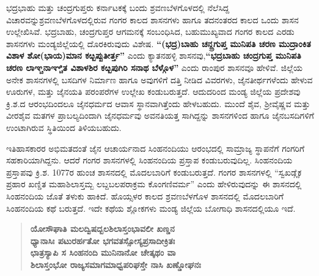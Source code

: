ಭದ್ರಭಾಹು ಮತ್ತು ಚಂದ್ರಗುಪ್ತರು ಕರ್ನಾಟಕಕ್ಕೆ ಬಂದು ಶ್ರವಣಬೆಳಗೊಳದಲ್ಲಿ ನೆಲೆಸಿದ್ದ ವಿಚಾರವನ್ನು\break ಶ್ರವಣಬೆಳಗೊಳದಲ್ಲಿರುವ ಗಂಗರ ಕಾಲದ ಶಾಸನಗಳು ಹಾಗೂ ತದನಂತರದ ಕಾಲದ ಒಂದು ಶಾಸನ ಉಲ್ಲೇಖಿಸಿವೆ. ಭದ್ರಬಾಹು, ಚಂದ್ರಗುಪ್ತರ ಆಗಮನಕ್ಕೆ ಸಂಬಂಧಿಸಿದ, ಬಹುಮುಖ್ಯವಾದ ಗಂಗರ ಕಾಲದ ಎರಡು ಶಾಸನಗಳು ಮಂಡ್ಯಜಿಲ್ಲೆ\-ಯಲ್ಲಿ ದೊರಕಿರುವುದು ವಿಶೇಷ. \textbf{“(ಭದ್ರ)ಬಾಹು ಚನ್ದ್ರಗುಪ್ತ ಮುನಿಪತಿ ಚರಣ ಮುದ್ರಾಂಕಿತ ವಿಶಾಳ ಶೋ(ಭಾಯ)ಮಾನ ಕೞ್ಬಪ್ಪುತೀರ್ತ್ತ”} ಎಂದು ಕ್ಯಾತನಹಳ್ಳಿ ಶಾಸನವು,\textbf{“ಭದ್ರಬಾಹು ಚಂದ್ರಗುಪ್ತ ಮುನಿಪತಿ ಚರಣ ಲಾಞ್ಚನಾಞ್ಚಿತ ವಿಶಾಳಶಿರ ಕೞ್ಬಪುಗಿರಿ ಸನಾಥ ಬೆಳ್ಗೊಳ”} ಎಂದು ರಾಂಪುರ ಶಾಸನವೂ ಹೇಳಿವೆ. ಜಿಲ್ಲೆಯ ಅನೇಕ ಶಾಸನಗಳಲ್ಲಿ ಬಸದಿಗಳ ನಿರ್ಮಾಣ ಹಾಗೂ ಅವುಗಳಿಗೆ ದತ್ತಿ ನೀಡಿದ ವಿವರಗಳು, ಜೈನತೀರ್ಥಗಳೆಂದು ಹೇಳುವ ಊರುಗಳ, ಮತ್ತು ಜೈನಯತಿ ಪರಂಪರೆಗಳ ಉಲ್ಲೇಖ ಕಂಡುಬರುತ್ತದೆ. ಆದುದರಿಂದ ಮಂಡ್ಯ ಜಿಲ್ಲೆಯ ಪ್ರದೇಶವು ಕ್ರಿ.ಶ.ದ ಆರಂಭದಿಂದಲೂ ಜೈನಧರ್ಮದ ಆವಾಸ ಸ್ಥಾನವಾಗಿತ್ತೆಂದು ಹೇಳಬಹುದು. ಮುಂದೆ ಶೈವ, ಶ‍್ರೀವೈಷ್ಣವ ಮತ್ತು ವೀರಶೈವ ಮತಗಳ ಪ್ರಾಬಲ್ಯದಿಂದಾಗಿ ಜೈನಧರ್ಮವು ಅವನತಿಯತ್ತ ಸಾಗಿದ್ದನ್ನು ಶಾಸನಗಳಿಂದ ಹಾಗೂ ಜೈನಬಸದಿಗಳಿಗೆ ಉಂಟಾಗಿರುವ ಸ್ಥಿತಿಯಿಂದ ತಿಳಿಯಬಹುದು.

ಇತಿಹಾಸಕಾರರ ಅಭಿಮತದಂತೆ ಜೈನ ಆಚಾರ್ಯನಾದ ಸಿಂಹನಂದಿಯು ಆರಂಭದಲ್ಲಿ ಸಾಮ್ರಾಜ್ಯ ಸ್ಥಾಪನೆಗೆ ಗಂಗರಿಗೆ ಸಹಕಾರಿಯಾಗಿದ್ದನು. ಆದರೆ ಗಂಗರ ಶಾಸನಗಳಲ್ಲಿ ಸಿಂಹನಂದಿಯ ಪ್ರಸ್ತಾಪ ಕಂಡುಬರುವುದಿಲ್ಲ. ಸಿಂಹನಂದಿಯ ಪ್ರಸ್ತಾಪವು ಕ್ರಿ.ಶ. 1077ರ ಹುಂಚ ಶಾಸನದಲ್ಲಿ ಮೊದಲಬಾರಿಗೆ ಕಂಡುಬರುತ್ತದೆ. ಗಂಗರ ಶಾಸನಗಳಲ್ಲಿ “ಸ್ವಖಡ್ಗೈಕ ಪ್ರಹಾರ ಖಣ್ಡಿತ ಮಹಾಶಿಲಾಸ್ತಮ್ಬ ಲಬ್ದಬಲಪರಾಕ್ರಮ ಕೊಂಗಣಿವರ್ಮ” ಎಂದು ಹೇಳಿರುವುದನ್ನು ಈ ಶಾಸನದಲ್ಲಿ ಸಿಂಹನಂದಿಯ ಜೊತೆ ತಳುಕು ಹಾಕಿದೆ. ಹೊಯ್ಸಳರ ಕಾಲದ ಶ್ರವಣಬೆಳಗೊಳ ಶಾಸನದಲ್ಲಿ ಮೊದಲಬಾರಿಗೆ ಸಿಂಹನಂದಿಯ ಕಥೆ ಬರುತ್ತದೆ. ಇದೇ ಕಥೆಯ ಶ್ಲೋಕಗಳು ಮಂಡ್ಯ ಜಿಲ್ಲೆಯ ಬೋಗಾಧಿ ಶಾಸನದಲ್ಲಿಯೂ ಇದೆ.

\begin{verse}
\textbf{ಯೋಸೌಘಾತಿ ಮಲದ್ವಿಷದ್ಬಲಶಿಲಾಸ್ತಂಭಾವಲೀ ಖಣ್ಡನ} \\\textbf{ಧ್ಯಾನಾಸಿಃ ಪಟುರರ್ಹತೋ ಭಗವತಸ್ಸೋಸ್ಯಪ್ರಸಾದೀಕ್ರಿತಃ} \\\textbf{ಛಾತ್ರಸ್ಯಾಪಿ ಸ ಸಿಂಹನಂದಿ ಮುನಿನಾನೋ ಚೇತ್ಕಥಂ ವಾ} \\\textbf{ಶಿಲಾಸ್ತಂಭೋ ರಾಜ್ಯಸಮಾಗಮಾಧ್ವಪರಿಘಸ್ತೇ ನಾಸಿ ಖಣ್ಡೋಘನಃ}
\end{verse}

